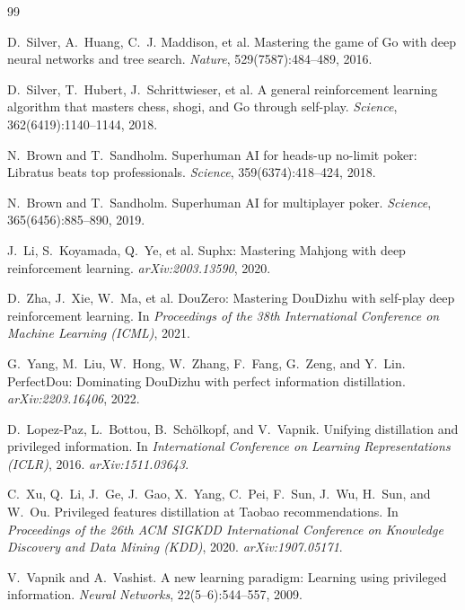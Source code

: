 \documentclass[11pt]{article}
\begin{document}
\begin{thebibliography}{99}

D.~Silver, A.~Huang, C.~J. Maddison, et al.
\newblock Mastering the game of Go with deep neural networks and tree search.
\newblock \emph{Nature}, 529(7587):484--489, 2016.

D.~Silver, T.~Hubert, J.~Schrittwieser, et al.
\newblock A general reinforcement learning algorithm that masters chess, shogi, and Go through self-play.
\newblock \emph{Science}, 362(6419):1140--1144, 2018.

N.~Brown and T.~Sandholm.
\newblock Superhuman AI for heads-up no-limit poker: Libratus beats top professionals.
\newblock \emph{Science}, 359(6374):418--424, 2018.

N.~Brown and T.~Sandholm.
\newblock Superhuman AI for multiplayer poker.
\newblock \emph{Science}, 365(6456):885--890, 2019.

J.~Li, S.~Koyamada, Q.~Ye, et al.
\newblock Suphx: Mastering Mahjong with deep reinforcement learning.
\newblock \emph{arXiv:2003.13590}, 2020.

D.~Zha, J.~Xie, W.~Ma, et al.
\newblock DouZero: Mastering DouDizhu with self-play deep reinforcement learning.
\newblock In \emph{Proceedings of the 38th International Conference on Machine Learning (ICML)}, 2021.

G.~Yang, M.~Liu, W.~Hong, W.~Zhang, F.~Fang, G.~Zeng, and Y.~Lin.
\newblock PerfectDou: Dominating DouDizhu with perfect information distillation.
\newblock \emph{arXiv:2203.16406}, 2022.

D.~Lopez-Paz, L.~Bottou, B.~Sch\"{o}lkopf, and V.~Vapnik.
\newblock Unifying distillation and privileged information.
\newblock In \emph{International Conference on Learning Representations (ICLR)}, 2016.
\newblock \emph{arXiv:1511.03643}.

C.~Xu, Q.~Li, J.~Ge, J.~Gao, X.~Yang, C.~Pei, F.~Sun, J.~Wu, H.~Sun, and W.~Ou.
\newblock Privileged features distillation at Taobao recommendations.
\newblock In \emph{Proceedings of the 26th ACM SIGKDD International Conference on Knowledge
Discovery and Data Mining (KDD)}, 2020.
\newblock \emph{arXiv:1907.05171}.

V.~Vapnik and A.~Vashist.
\newblock A new learning paradigm: Learning using privileged information.
\newblock \emph{Neural Networks}, 22(5--6):544--557, 2009.


\end{thebibliography}
\end{document}
